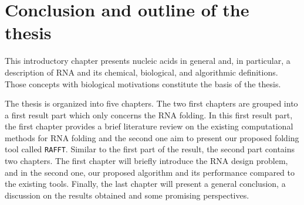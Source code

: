 \section{Conclusion and outline of the thesis}

This introductory chapter presents nucleic acids in general and, in particular, a description of RNA and its chemical, biological, and algorithmic definitions. Those concepts with biological motivations constitute the basis of the thesis. 

The thesis is organized into five chapters. The two first chapters are grouped into a first result part which only concerns the RNA folding. In this first result part, the first chapter provides a brief literature review on the existing computational methods for RNA folding and the second one aim to present our proposed folding tool called \texttt{RAFFT}. Similar to the first part of the result, the second part contains two chapters. The first chapter will briefly introduce the RNA design problem, and in the second one, our proposed algorithm and its performance compared to the existing tools. Finally, the last chapter will present a general conclusion, a discussion on the results obtained and some promising perspectives. 


